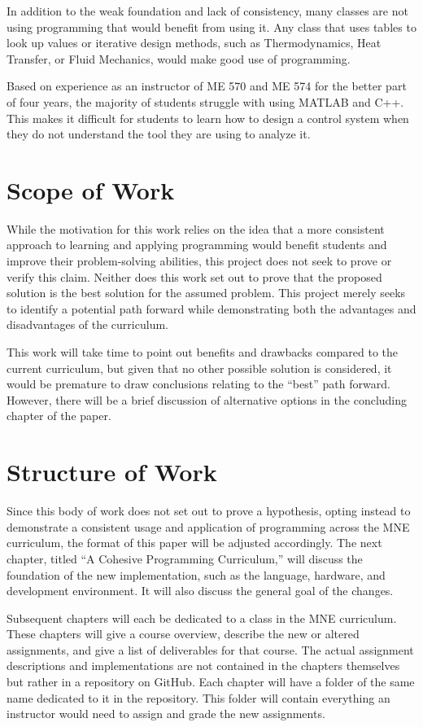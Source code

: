 In addition to the weak foundation and lack of consistency, many classes are not using
programming that would benefit from using it. Any class that uses tables to look up values
or iterative design methods, such as Thermodynamics, Heat Transfer, or Fluid Mechanics, 
would make good use of programming. 

Based on experience as an instructor of ME 570 and ME 574 for the better part of 
four years, the majority of students struggle with using MATLAB and C++. This makes it 
difficult for students to learn how to design a control system when they do not understand 
the tool they are using to analyze it.

\section{Scope of Work}

While the motivation for this work relies on the idea that a more consistent approach to
learning and applying programming would benefit students and improve their problem-solving
abilities, this project does not seek to prove or verify this claim. Neither does this
work set out to prove that the proposed solution is the best solution for the assumed
problem. This project merely seeks to identify a potential path forward while 
demonstrating both the advantages and disadvantages of the curriculum. 

This work will take time to point out benefits and drawbacks compared to the current 
curriculum, but given that no other possible solution is considered, it would be
premature to draw conclusions relating to the ``best'' path forward. However, there 
will be a brief discussion of alternative options in the concluding chapter of the paper.

\section{Structure of Work}

Since this body of work does not set out to prove a hypothesis, opting instead to demonstrate
a consistent usage and application of programming across the MNE curriculum, the format of
this paper will be adjusted accordingly. The next chapter, titled ``A Cohesive Programming
Curriculum,'' will discuss the foundation of the new implementation, such as the language,
hardware, and development environment. It will also discuss the general goal of the changes.

Subsequent chapters will each be dedicated to a class in the MNE curriculum. These chapters
will give a course overview, describe the new or altered assignments, and give a list
of deliverables for that course. The actual assignment descriptions and implementations
are not contained in the chapters themselves but rather in a repository on GitHub. Each 
chapter will have a folder of the same name dedicated to it in the repository. This folder
will contain everything an instructor would need to assign and grade the new assignments.
